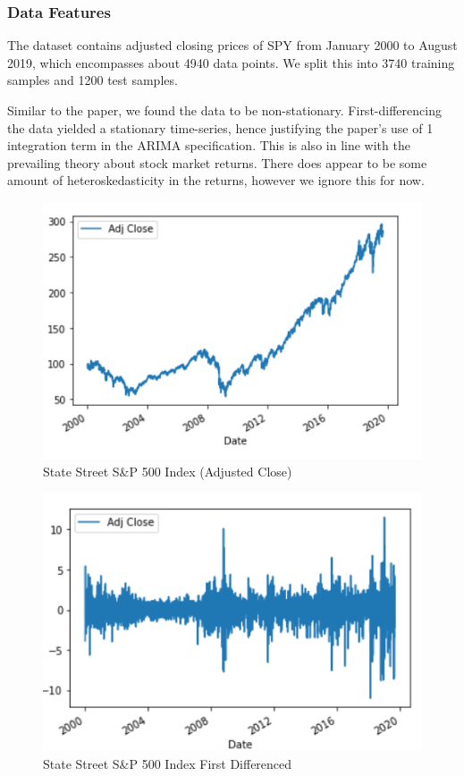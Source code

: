 \documentclass{article}
\begin{document}
\subsubsection{Data Features}

The dataset contains adjusted closing prices of SPY from January 2000 to August 2019, which encompasses about 4940 data points. We split this into 3740 training samples and 1200 test samples.

Similar to the paper, we found the data to be non-stationary. First-differencing the data yielded a stationary time-series, hence justifying the paper's use of 1 integration term in the ARIMA specification. This is also in line with the prevailing theory about stock market returns. There does appear to be some amount of heteroskedasticity in the returns, however we ignore this for now. 

\begin{figure}
  \centering
  \includegraphics{SPY Raw Series.png}
  \caption{State Street S\&P 500 Index (Adjusted Close)}
\end{figure}

\FloatBarrier

\begin{figure}
  \centering
  \includegraphics{SPY Differenced.png}
  \caption{State Street S\&P 500 Index First Differenced}
\end{figure}
\end{document}
